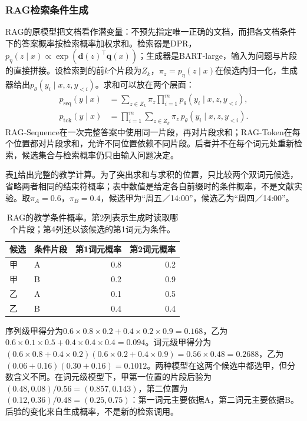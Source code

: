 \subsubsection{RAG检索条件生成}
\label{sec:nlp-dialogue-rag}

RAG的原模型把文档看作潜变量：不预先指定唯一正确的文档，而把各文档条件下的答案概率按检索概率加权求和。检索器是DPR，$p_\eta(z\mid x)\propto\exp(\bm d(z)^{\top}\bm q(x))$；生成器是BART-large，输入为问题与片段的直接拼接。设检索到的前$k$个片段为$Z_k$，$\pi_z=p_\eta(z\mid x)$在候选内归一化，生成器给出$p_\theta(y_i\mid x,z,y_{<i})$。求和可以放在两个层面：
\begin{equation}
\begin{aligned}
 p_{\mathrm{seq}}(y\mid x)
 &=\sum_{z\in Z_k}\pi_z
      \prod_{i=1}^{m}p_\theta(y_i\mid x,z,y_{<i}),\\
 p_{\mathrm{tok}}(y\mid x)
 &=\prod_{i=1}^{m}
      \sum_{z\in Z_k}\pi_z\, p_\theta(y_i\mid x,z,y_{<i}).
\end{aligned}
\label{eq:nlp-dialogue-rag}
\end{equation}
RAG-Sequence在一次完整答案中使用同一片段，再对片段求和；RAG-Token在每个位置都对片段求和，允许不同位置依赖不同片段。后者并不在每个词元处重新检索，候选集合与检索概率仍只由输入问题决定。

表\ref{tab:nlp-dialogue-rag}给出完整的教学计算。为了突出求和与求积的位置，只比较两个双词元候选，省略两者相同的结束符概率；表中数值是给定各自前缀时的条件概率，不是文献实验。取$\pi_A=0.6$，$\pi_B=0.4$，候选甲为“周五／14:00”，候选乙为“周四／14:00”。

\begin{table}[htbp]
  \centering
  \begin{tabular}{llrr}
    \toprule
    候选 & 条件片段 & 第1词元概率 & 第2词元概率\\
    \midrule
    甲 & A & 0.8 & 0.2\\
    甲 & B & 0.2 & 0.9\\
    乙 & A & 0.1 & 0.5\\
    乙 & B & 0.4 & 0.4\\
    \bottomrule
  \end{tabular}
  \caption{RAG的教学条件概率。第2列表示生成时读取哪个片段；第4列还以该候选的第1词元为条件。}
  \label{tab:nlp-dialogue-rag}
\end{table}

序列级甲得分为$0.6\times0.8\times0.2+0.4\times0.2\times0.9=0.168$，乙为$0.6\times0.1\times0.5+0.4\times0.4\times0.4=0.094$。词元级甲得分为$(0.6\times0.8+0.4\times0.2)(0.6\times0.2+0.4\times0.9)=0.56\times0.48=0.2688$，乙为$(0.06+0.16)(0.30+0.16)=0.1012$。两种模型在这两个候选中都选甲，但分数含义不同。在词元级模型下，甲第一位置的片段后验为$(0.48,0.08)/0.56=(0.857,0.143)$，第二位置为$(0.12,0.36)/0.48=(0.25,0.75)$：第一词元主要依据A，第二词元主要依据B。后验的变化来自生成概率，不是新的检索调用。

